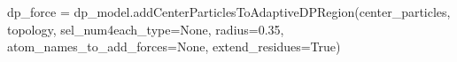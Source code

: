 dp_force = dp_model.addCenterParticlesToAdaptiveDPRegion(center_particles, topology, sel_num4each_type=None, radius=0.35, atom_names_to_add_forces=None, extend_residues=True)